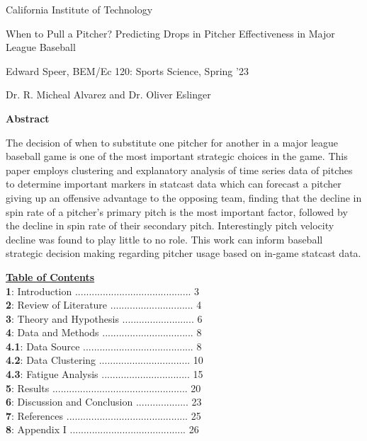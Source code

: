 \documentclass[12 pt]{article}
\begin{document}
\begin{center} \normalsize California Institute of Technology \\ \end{center}
\vspace*{\fill}
\begin{center}
    \Large When to Pull a Pitcher? Predicting Drops in Pitcher Effectiveness in 
    Major League Baseball \color{black}
\end{center}
\begin{center} \normalsize Edward Speer, BEM/Ec 120: Sports Science, Spring '23\\ \end{center}
\begin{center} \normalsize Dr. R. Micheal Alvarez and Dr. Oliver Eslinger\\ \end{center}
\vspace*{\fill}
\begin{center}\textbf{Abstract}\end{center}
The decision of when to substitute one pitcher for another in a major league baseball 
game is one of the most important strategic choices in the game. This paper employs clustering and 
explanatory analysis of time series data of pitches to determine important markers in statcast data 
which can forecast a pitcher giving up an offensive advantage to the opposing team, finding that the 
decline in spin rate of a pitcher's primary pitch is the most important factor, followed by the decline in spin rate of 
their secondary pitch. Interestingly pitch velocity decline was found to play little to no role. 
This work can inform baseball strategic decision making regarding pitcher usage 
based on in-game statcast data.

\pagebreak
\begin{center}
    \underline{\textbf{Table of Contents}} \\ \hfill \break
    \textbf{1}: Introduction .......................................... 3 \\
    \textbf{2}: Review of Literature .............................. 4 \\
    \textbf{3}: Theory and Hypothesis .......................... 6 \\
    \textbf{4}: Data and Methods ................................. 8 \\
    \textbf{4.1}: Data Source ........................................ 8 \\
    \textbf{4.2}: Data Clustering ................................. 10 \\
    \textbf{4.3}: Fatigue Analysis ................................ 15 \\
    \textbf{5}: Results ................................................. 20 \\
    \textbf{6}: Discussion and Conclusion ................... 23 \\ 
    \textbf{7}: References ............................................ 25 \\
    \textbf{8}: Appendix I .......................................... 26 \\
\end{center}
\end{document}

